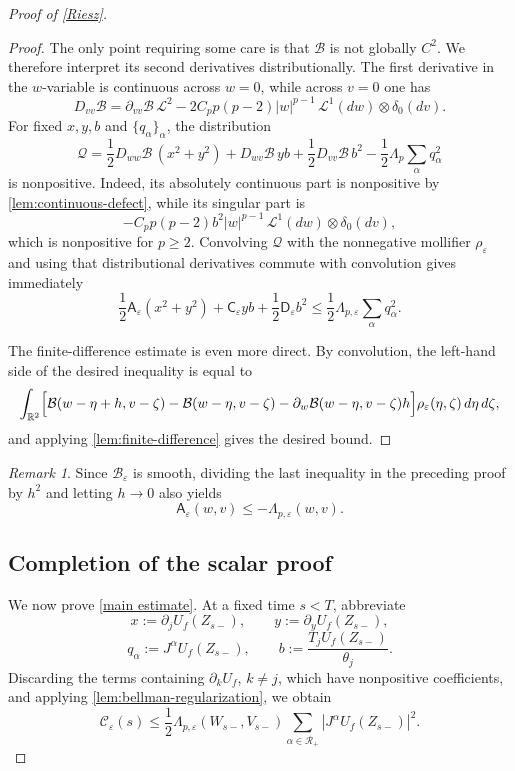 \documentclass[11pt]{amsart}
\theoremstyle{definition}
\theoremstyle{remark}
\newtheorem{remark}[theorem]{Remark}
\numberwithin{equation}{section}
\newcommand{\R}{\mathbb{R}}
\newcommand{\RR}{\mathcal{R}}
\begin{document}
\begin{proof}[Proof of \cref{Riesz}]
\begin{proof}
The only point requiring some care is that $\mathcal B$ is not globally
$C^2$. We therefore interpret its second derivatives distributionally.
The first derivative in the $w$-variable is continuous across $w=0$,
while across $v=0$ one has
\[
D_{vv}\mathcal B
=\partial_{vv}\mathcal B\,\mathcal L^2
-2C_pp(p-2)|w|^{p-1}\,
\mathcal L^1(dw)\otimes\delta_0(dv).
\]
For fixed $x,y,b$ and $\{q_\alpha\}_\alpha$, the distribution
\[
\mathscr Q
=\frac12D_{ww}\mathcal B\,(x^2+y^2)
+D_{wv}\mathcal B\,yb
+\frac12D_{vv}\mathcal B\,b^2
-\frac12\Lambda_p\sum_\alpha q_\alpha^2
\]
is nonpositive. Indeed, its absolutely continuous part is nonpositive
by \cref{lem:continuous-defect}, while its singular part is
\[
-C_pp(p-2)b^2|w|^{p-1}\,
\mathcal L^1(dw)\otimes\delta_0(dv),
\]
which is nonpositive for $p\geq2$. Convolving $\mathscr Q$ with the nonnegative mollifier
$\rho_\varepsilon$ and using that distributional derivatives
commute with convolution gives immediately
\[
\frac12\mathsf A_\varepsilon(x^2+y^2)
+\mathsf C_\varepsilon yb
+\frac12\mathsf D_\varepsilon b^2
\leq\frac12\Lambda_{p,\varepsilon}\sum_\alpha q_\alpha^2.
\]

The finite-difference estimate is even more direct. By convolution, the left-hand side of the desired inequality is equal to
\[
\int_{\R^2}\Bigl[
\mathcal B(w-\eta+h,v-\zeta)
-\mathcal B(w-\eta,v-\zeta)
-\partial_w\mathcal B(w-\eta,v-\zeta)h
\Bigr]\rho_\varepsilon(\eta,\zeta)\,d\eta\,d\zeta,
\]
and applying \cref{lem:finite-difference} gives the desired bound.
\end{proof}

\begin{remark}
Since $\mathcal B_\varepsilon$ is smooth, dividing the last inequality in the preceding proof by $h^2$ and letting $h\to0$ also yields
\[
\mathsf A_\varepsilon(w,v)\leq-\Lambda_{p,\varepsilon}(w,v).
\]
\end{remark}

\subsection{Completion of the scalar proof}

We now prove \eqref{main estimate}. At a fixed time $s<T$, abbreviate
\[
x:=\partial_jU_f(Z_{s-}),
\qquad y:=\partial_yU_f(Z_{s-}),
\]
\[
q_\alpha:=J^\alpha U_f(Z_{s-}),
\qquad b:=\frac{T_jU_f(Z_{s-})}{\theta_j}.
\]
Discarding the terms containing $\partial_kU_f$, $k\neq j$, which have nonpositive coefficients, and applying \cref{lem:bellman-regularization}, we obtain
\[
\mathscr C_\varepsilon(s)
\leq\frac12\Lambda_{p,\varepsilon}(W_{s-},V_{s-})
\sum_{\alpha\in\RR_+}|J^\alpha U_f(Z_{s-})|^2.
\]


\end{proof}
\end{document}
